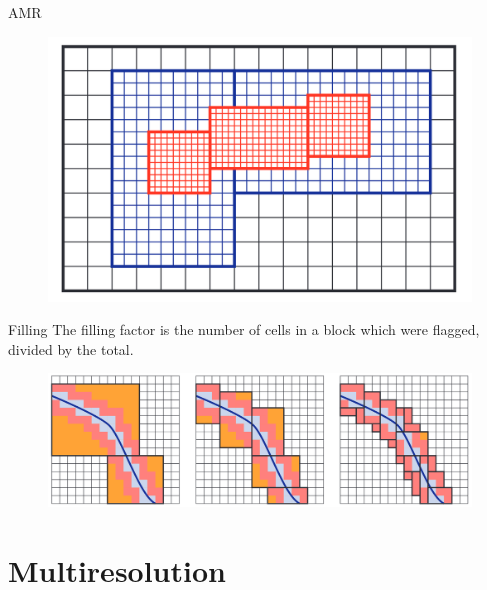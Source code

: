 \documentclass{beamer}
\begin{document}
\begin{frame}{AMR}
    \begin{figure}
        \center
        \includegraphics[scale=0.4]{amr3.png}
    \end{figure}
\end{frame}

\begin{frame}{Filling}
    The filling factor is the number of cells in a block which were flagged, divided by the total.
    \begin{figure}
        \center
        \includegraphics[scale=0.3]{filling.png}
    \end{figure}
\end{frame}

\section{Multiresolution}
\end{document}
